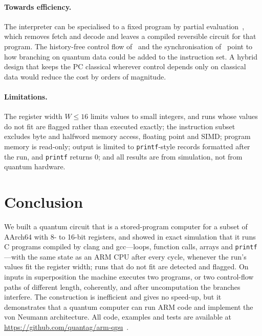 \documentclass[11pt]{article}
\begin{document}
\paragraph{Towards efficiency.} The interpreter can be specialised to a fixed program by
partial evaluation~\cite{futamura1971}, which removes fetch and decode and leaves a compiled
reversible circuit for that program. The history-free control flow of~\cite{yuan2024qcm} and
the synchronisation of~\cite{zhang2025qrm} point to how branching on quantum data could be
added to the instruction set. A hybrid design that keeps the PC classical wherever control
depends only on classical data would reduce the cost by orders of magnitude.

\paragraph{Limitations.} The register width $W\le16$ limits values to small integers, and runs whose
values do not fit are flagged rather than executed exactly; the instruction subset excludes byte and
halfword memory access, floating point and SIMD; program memory is read-only; output is limited to
\texttt{printf}-style records formatted after the run, and \texttt{printf} returns 0; and all results
are from simulation, not from quantum hardware.

\section{Conclusion}

We built a quantum circuit that is a stored-program computer for a subset of AArch64 with 8- to
16-bit registers, and showed in exact simulation that it runs C programs compiled by clang and
gcc---loops, function calls, arrays and \texttt{printf}---with the same state as an ARM CPU after every
cycle, whenever the run's values fit the register width; runs that do not fit are detected and
flagged. On inputs in superposition the machine executes two programs, or two control-flow paths of
different length, coherently, and after uncomputation the branches interfere. The construction is
inefficient and gives no speed-up, but it demonstrates that a quantum computer can run ARM code and
implement the von Neumann architecture. All code, examples and tests are available at
\url{https://github.com/quantag/arm-qpu}~\cite{armqpu}.



\end{document}
